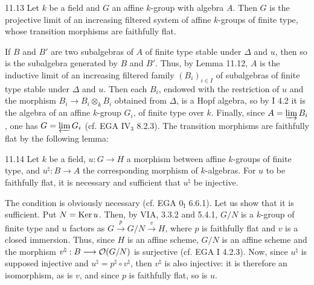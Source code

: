 \begin{proposition}{11.13}\label{VIB.11.13}
Let $k$ be a field and $G$ an affine $k$-group with algebra $A$. Then $G$ is the projective limit of an increasing filtered system of affine $k$-groups of finite type, whose transition morphisms are faithfully flat.
\end{proposition}
If $B$ and $B'$ are two subalgebras of $A$ of finite type stable under $\Delta$ and $u$, then so is the subalgebra generated by $B$ and $B'$. Thus, by Lemma 11.12, $A$ is the inductive limit of an increasing filtered family $(B_i)_{i\in I}$ of subalgebras of finite type stable under $\Delta$ and $u$. Then each $B_i$, endowed with the restriction of $u$ and the morphism $B_i\to B_i\otimes_k B_i$ obtained from $\Delta$, is a Hopf algebra, so by I 4.2 it is the algebra of an affine $k$-group $G_i$, of finite type over $k$. Finally, since $A=\varinjlim B_i$, one has $G=\varprojlim G_i$ (cf. EGA IV$_3$ 8.2.3). The transition morphisms are faithfully flat by the following lemma:

\begin{lemma}{11.14}\label{VIB.11.14}
Let $k$ be a field, $u:G\to H$ a morphism between affine $k$-groups of finite type, and $u^\natural:B\to A$ the corresponding morphism of $k$-algebras. For $u$ to be faithfully flat, it is necessary and sufficient that $u^\natural$ be injective.
\end{lemma}
The condition is obviously necessary (cf. EGA 0$_{\mathrm I}$ 6.6.1). Let us show that it is sufficient. Put $N=\operatorname{Ker} u$. Then, by VIA, 3.3.2 and 5.4.1, $G/N$ is a $k$-group of finite type and $u$ factors as $G\xrightarrow{p}G/N\xrightarrow{v}H$, where $p$ is faithfully flat and $v$ is a closed immersion. Thus, since $H$ is an affine scheme, $G/N$ is an affine scheme and the morphism $v^\natural:B\longrightarrow\mathcal{O}(G/N)$ is surjective (cf. EGA I 4.2.3). Now, since $u^\natural$ is supposed injective and $u^\natural=p^\natural\circ v^\natural$, then $v^\natural$ is also injective: it is therefore an isomorphism, as is $v$, and since $p$ is faithfully flat, so is $u$.

